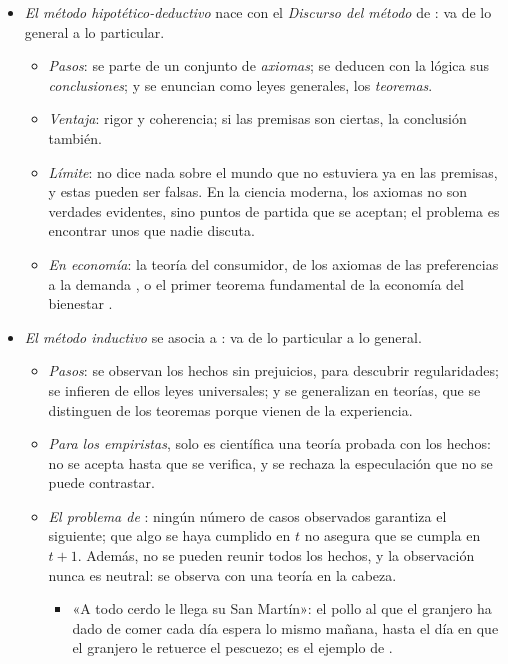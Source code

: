 \documentclass[11pt]{article}
\begin{document}
\begin{itemize}
\item \emph{El método hipotético-deductivo} nace con el \emph{Discurso del método} de \textcite{Descartes1637Discours}: va de lo general a lo particular.
  \begin{itemize}
  \item \emph{Pasos}: se parte de un conjunto de \emph{axiomas}; se deducen con la lógica sus \emph{conclusiones}; y se enuncian como leyes generales, los \emph{teoremas}.
  \item \emph{Ventaja}: rigor y coherencia; si las premisas son ciertas, la conclusión también.
  \item \emph{Límite}: no dice nada sobre el mundo que no estuviera ya en las premisas, y estas pueden ser falsas. En la ciencia moderna, los axiomas no son verdades evidentes, sino puntos de partida que se aceptan; el problema es encontrar unos que nadie discuta.
  \item \emph{En economía}: la teoría del consumidor, de los axiomas de las preferencias a la demanda , o el primer teorema fundamental de la economía del bienestar .
  \end{itemize}
\item \emph{El método inductivo} se asocia a \textcite{Bacon1620Novum}: va de lo particular a lo general.
  \begin{itemize}
  \item \emph{Pasos}: se observan los hechos sin prejuicios, para descubrir regularidades; se infieren de ellos leyes universales; y se generalizan en teorías, que se distinguen de los teoremas porque vienen de la experiencia.
  \item \emph{Para los empiristas}, solo es científica una teoría probada con los hechos: no se acepta hasta que se verifica, y se rechaza la especulación que no se puede contrastar.
  \item \emph{El problema de }: ningún número de casos observados garantiza el siguiente; que algo se haya cumplido en $t$ no asegura que se cumpla en $t+1$\nocite{Hume1748Enquiry}. Además, no se pueden reunir todos los hechos, y la observación nunca es neutral: se observa con una teoría en la cabeza.
    \begin{itemize}
    \item «A todo cerdo le llega su San Martín»: el pollo al que el granjero ha dado de comer cada día espera lo mismo mañana, hasta el día en que el granjero le retuerce el pescuezo; es el ejemplo de  \parencite*[cap.~VI]{Russell1912Problems}.

\end{itemize}
\end{itemize}
\end{itemize}
\end{document}
